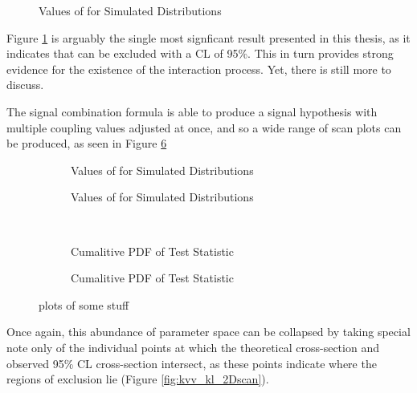     \begin{figure} %
         
        \caption{Values of \qtil for Simulated Distributions}
        \label{fig:kvv_SM_scan}
    \end{figure}

    Figure \ref{fig:kvv_SM_scan} is arguably the single most signficant result presented in this thesis,
        as it indicates that  can be excluded with a CL of 95\%.
    This in turn provides strong evidence for the existence of the \HHVV interaction process.
    Yet, there is still more to discuss.

    The signal combination formula is able to produce a signal hypothesis with multiple coupling values adjusted at once,
        and so a wide range of \kvv scan plots can be produced, as seen in Figure \ref{fig:kvv_multi_kl}

    \begin{figure} %
        \centering
        \begin{subfigure}{0.4\textwidth} 
             
            \caption{Values of \qtil for Simulated Distributions}
            \label{fig:kvv_scan_kl0}
        \end{subfigure}
        \begin{subfigure}{0.4\textwidth} 
             
            \caption{Values of \qtil for Simulated Distributions}
            \label{fig:kvv_scan_kl1}
        \end{subfigure} \\
        \begin{subfigure}{0.4\textwidth}
             
            \caption{Cumalitive PDF of \qtil Test Statistic}
            \label{fig:kvv_scan_kl2}
        \end{subfigure}
        \begin{subfigure}{0.4\textwidth}
             
            \caption{Cumalitive PDF of \qtil Test Statistic}
            \label{fig:kvv_scan_kl10}
        \end{subfigure}
        \caption{
            plots of some stuff
        }\label{fig:kvv_multi_kl}
    \end{figure}

    Once again, this abundance of parameter space can be collapsed by taking special note only of
        the individual points at which the theoretical cross-section and observed 95\% CL cross-section intersect,
        as these points indicate where the regions of exclusion lie (Figure \ref{fig:kvv_kl_2Dscan}).


